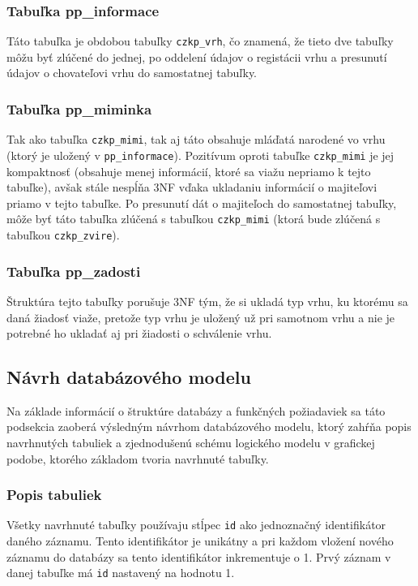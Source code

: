 \subsubsection*{Tabuľka pp\_informace}
Táto tabuľka je obdobou tabuľky \texttt{czkp_vrh}, čo znamená, že tieto dve tabuľky môžu byť zlúčené do jednej, po oddelení údajov o registácii vrhu a presunutí údajov o chovateľovi vrhu do samostatnej tabuľky.

\subsubsection*{Tabuľka pp\_miminka}
Tak ako tabuľka \texttt{czkp_mimi}, tak aj táto obsahuje mláďatá narodené vo vrhu (ktorý je uložený v \texttt{pp_informace}). Pozitívum oproti tabuľke \texttt{czkp_mimi} je jej kompaktnosť (obsahuje menej informácií, ktoré sa viažu nepriamo k tejto tabuľke), avšak stále nespĺňa 3NF vďaka ukladaniu informácií o majiteľovi priamo v tejto tabuľke. Po presunutí dát o majiteľoch do samostatnej tabuľky, môže byť táto tabuľka zlúčená s tabuľkou \texttt{czkp_mimi} (ktorá bude zlúčená s tabuľkou \texttt{czkp_zvire}).

\subsubsection*{Tabuľka pp\_zadosti}
Štruktúra tejto tabuľky porušuje 3NF tým, že si ukladá typ vrhu, ku ktorému sa daná žiadosť viaže, pretože typ vrhu je uložený 
už pri samotnom vrhu a nie je potrebné ho ukladať aj pri žiadosti o schválenie vrhu.

\subsection{Návrh databázového modelu}
Na základe informácií o štruktúre databázy a funkčných požiadaviek sa táto podsekcia zaoberá výsledným návrhom databázového modelu, ktorý zahŕňa popis navrhnutých tabuliek a zjednodušenú schému logického modelu v grafickej podobe, ktorého základom tvoria navrhnuté tabuľky.

\subsubsection{Popis tabuliek}
Všetky navrhnuté tabuľky používaju stĺpec \texttt{id} ako jednoznačný identifikátor daného záznamu.
Tento identifikátor je unikátny a pri každom vložení nového záznamu do databázy sa tento identifikátor inkrementuje o 1.
Prvý záznam v danej tabuľke má \texttt{id} nastavený na hodnotu 1.

